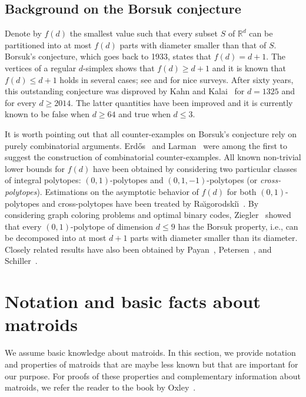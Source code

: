 \documentclass[12pt]{amsart}
\theoremstyle{plain}
\theoremstyle{definition}
\theoremstyle{remark}
\renewcommand{\leq}{\leqslant}
\renewcommand{\geq}{\geqslant}
\newcommand{\R}{\mathbb{R}}
\begin{document}
\subsection{Background on the Borsuk conjecture}

Denote by $f(d)$ the smallest value such that every subset $S$ of $\R^d$ can be partitioned into at most $f(d)$ parts with diameter smaller than that of $S$. Borsuk's conjecture, which goes back to 1933, states that $f(d)=d+1$. The vertices of a regular $d$-simplex shows that $f(d)\geq d+1$ and it is known that $f(d)\leq d+1$ holds in several cases; see \cite{grunbaum1963borsuk,rauigorodskiui2004borsuk} and \cite[Chapter 31]{boltyanski1996excursions} for nice surveys. After sixty years, this outstanding conjecture was disproved by Kahn and Kalai~\cite{kahn1993counterexample} for $d=1325$ and for every $d \geq 2014$. The latter quantities have been improved and it is currently known to be false when $d \geq 64$ and true when $d \leq 3$. 

It is worth pointing out that all counter-examples on Borsuk's conjecture rely on purely combinatorial arguments. Erd\H{o}s~\cite{erdos1981my} and Larman~\cite{larman84} were among the first to suggest the construction of combinatorial counter-examples. All known non-trivial lower bounds for $f(d)$ have been obtained by considering two particular classes of integral polytopes: $(0,1)$-polytopes and $(0,1,-1)$-polytopes (or {\em cross-polytopes}). Estimations on the asymptotic behavior of $f(d)$ for both $(0,1)$-polytopes and cross-polytopes have been treated by Ra\u{\i}gorodski\u{\i}~\cite{Rai1,Rai4,raigorodskii2002borsuk}. By considering graph coloring problems and optimal binary codes, Ziegler~\cite[Theorem 1]{ziegler2001coloring} showed that every $(0,1)$-polytope of dimension $d \leq 9$ has the Borsuk property, i.e., can be decomposed into at most $d+1$ parts with diameter smaller than its diameter. Closely related results have also been obtained by Payan~\cite{payan1992chromatic}, Petersen~\cite{Peter}, and Schiller~\cite{Sch}.

\section{Notation and basic facts about matroids}\label{sec:matr}

We assume basic knowledge about matroids. In this section, we provide notation and properties of matroids that are maybe less known but that are important for our purpose. For proofs of these properties and complementary information about matroids, we refer the reader to the book by Oxley~\cite{oxley2011matroid}.
\end{document}
